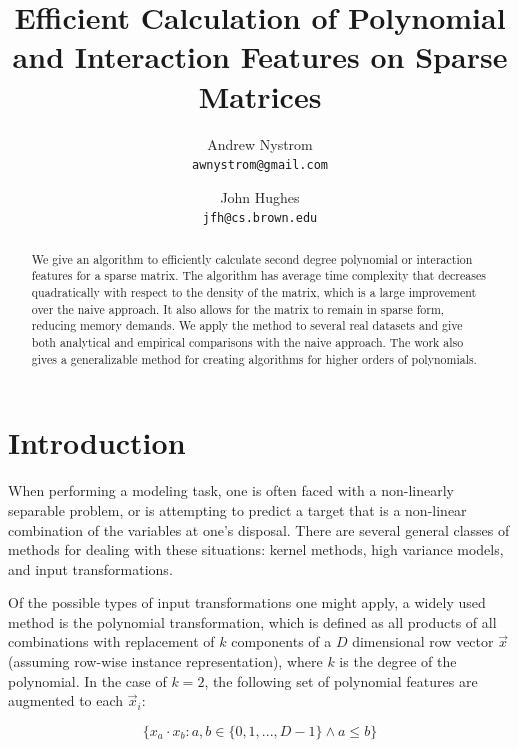 \documentclass[11pt,twocolumn]{article}
\begin{document}
\title{Efficient Calculation of Polynomial and Interaction Features on Sparse Matrices}
\author{
  Andrew Nystrom\\
  \texttt{awnystrom@gmail.com}
  \and
  John Hughes\\
  \texttt{jfh@cs.brown.edu}
}
\date{}

\maketitle

\begin{abstract}%
We give an algorithm to efficiently calculate second degree polynomial or interaction features for a sparse matrix.
The algorithm has average time complexity that decreases quadratically with respect to the density of the matrix, which
is a large improvement over the naive approach. It also allows for the matrix to remain in sparse form, reducing memory demands.
We apply the method to several real datasets and give both analytical and empirical comparisons with the
naive approach. The work also gives a generalizable method for creating algorithms for higher orders of polynomials.
\end{abstract}

\section{Introduction}

When performing a modeling task, one is often faced with a non-linearly separable problem,
or is attempting to predict a target that is a non-linear combination of the variables at one's disposal.
There are several general classes of methods for dealing with these situations: kernel methods, 
high variance models, and input transformations.

Of the possible types of input transformations one
might apply, a widely used method is the polynomial transformation, which is defined as 
all products of all combinations with replacement of $k$ components of a $D$ dimensional row vector $\vec{x}$ (assuming row-wise instance representation), where $k$ is the degree of the polynomial.
In the case of $k=2$, the following set of polynomial features are augmented to each $\vec{x}_i$:

\begin{equation*}
\{x_a \cdot x_b : a, b \in \{0,1,..., D-1\} \land a \le b\}
\end{equation*}
\end{document}

